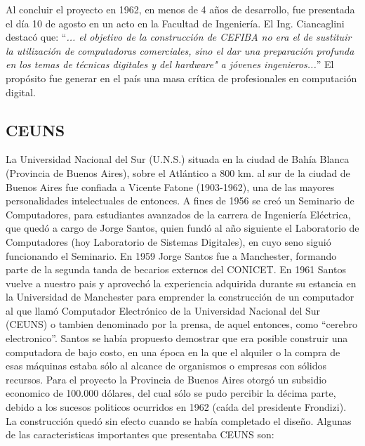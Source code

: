 \documentclass[%
 	final,
%
	notitlepage,
	narroweqnarray,
	inline,
 	twoside,
	]{ieee}
\begin{document}
Al concluir el proyecto en 1962, en menos de 4 a\~nos de desarrollo, fue presentada el d\'ia 10 de agosto en un acto en la Facultad de Ingenier\'ia. El Ing. Ciancaglini destac\'o que: ``\textit{... el objetivo de la construcci\'on de CEFIBA no era el de sustituir la utilizaci\'on de computadoras comerciales, sino el dar una preparaci\'on profunda en los temas de t\'ecnicas digitales y del hardware" a j\'ovenes ingenieros...}'' El prop\'osito fue generar en el pa\'is una masa cr\'itica de profesionales en computaci\'on digital.


\subsection*{CEUNS}
La Universidad Nacional del Sur (U.N.S.) situada en la ciudad de Bah\'ia Blanca (Provincia de Buenos Aires), sobre el Atl\'antico a 800 km. al sur de la ciudad de Buenos Aires fue confiada a Vicente Fatone (1903-1962), una de las mayores personalidades intelectuales de entonces. A fines de 1956 se cre\'o un Seminario de Computadores, para estudiantes avanzados de la carrera de Ingenier\'ia El\'ectrica, que qued\'o a cargo de Jorge Santos, quien fund\'o al a\~no siguiente el Laboratorio de Computadores (hoy Laboratorio de Sistemas Digitales), en cuyo seno sigui\'o funcionando el Seminario.
En 1959 Jorge Santos fue a Manchester, formando parte de la segunda tanda de becarios externos del CONICET. En 1961 Santos vuelve a nuestro pais y aprovech\'o la experiencia adquirida durante su estancia en la Universidad de Manchester para emprender la construcci\'on de un computador al que llam\'o Computador Electr\'onico de la Universidad Nacional del Sur (CEUNS) o tambien denominado por la prensa, de aquel entonces, como “cerebro electronico”. Santos se hab\'ia propuesto demostrar que era posible construir una  computadora de bajo costo, en una \'epoca en la que el alquiler o la compra de esas m\'aquinas estaba s\'olo al alcance de organismos o empresas con s\'olidos recursos. Para el proyecto la Provincia de Buenos Aires otorg\'o un subsidio economico de  100.000 d\'olares, del cual s\'olo se pudo percibir la d\'ecima parte, debido a los sucesos politicos ocurridos en 1962 (ca\'ida del presidente Frondizi). La construcci\'on qued\'o sin efecto cuando se hab\'ia completado el dise\~no.
Algunas de las caracteristicas importantes que presentaba CEUNS son:
\end{document}
